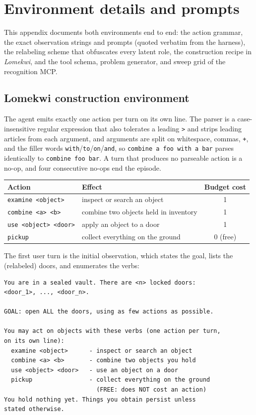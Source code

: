 \documentclass{article}
\begin{document}
\section{Environment details and prompts}
\label{app:env}

This appendix documents both environments end to end: the action grammar, the exact observation strings and prompts (quoted verbatim from the harness), the relabeling scheme that obfuscates every latent role, the construction recipe in \emph{Lomekwi}, and the tool schema, problem generator, and sweep grid of the recognition MCP.

\subsection{Lomekwi construction environment}
\label{app:env-lomekwi}

The agent emits exactly one action per turn on its own line. The parser is a case-insensitive regular expression that also tolerates a leading \texttt{>} and strips leading articles from each argument, and arguments are split on whitespace, commas, \texttt{+}, and the filler words \texttt{with}/\texttt{to}/\texttt{on}/\texttt{and}, so \texttt{combine a foo with a bar} parses identically to \texttt{combine foo bar}. A turn that produces no parseable action is a no-op, and four consecutive no-ops end the episode.

\begin{center}
\begin{tabular}{@{}llc@{}}
\toprule
Action & Effect & Budget cost \\
\midrule
\texttt{examine <object>}    & inspect or search an object            & 1 \\
\texttt{combine <a> <b>}      & combine two objects held in inventory  & 1 \\
\texttt{use <object> <door>}  & apply an object to a door               & 1 \\
\texttt{pickup}               & collect everything on the ground        & 0 (free) \\
\bottomrule
\end{tabular}
\end{center}

The first user turn is the initial observation, which states the goal, lists the (relabeled) doors, and enumerates the verbs:

\begin{verbatim}
You are in a sealed vault. There are <n> locked doors:
<door_1>, ..., <door_n>.

GOAL: open ALL the doors, using as few actions as possible.

You may act on objects with these verbs (one action per turn,
on its own line):
  examine <object>      - inspect or search an object
  combine <a> <b>       - combine two objects you hold
  use <object> <door>   - use an object on a door
  pickup                - collect everything on the ground
                          (FREE: does NOT cost an action)
You hold nothing yet. Things you obtain persist unless
stated otherwise.
\end{verbatim}
\end{document}
